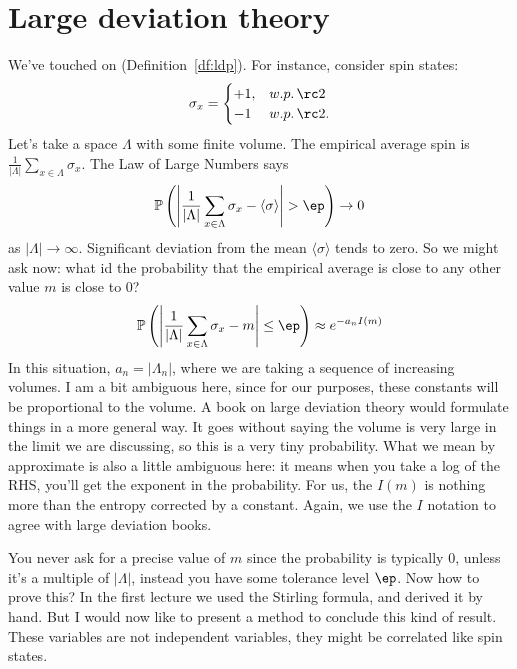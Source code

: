 \section{Large deviation theory}

We've touched on  (Definition~\ref{df:ldp}). For instance, consider spin states: 
\[
\sigma_x = 
\begin{cases}
+1, & w.p.\, \rc2 \\
-1 & w.p.\,\rc2.
\end{cases}
\]
Let's take a space $\Lambda$ with some finite volume. The empirical average spin is $\frac{1}{|\Lambda|} \sum_{x \in \Lambda} \sigma_x$. The Law of Large Numbers says 
\[
\mathbb{P}\left(\left|\frac{1}{|\Lambda|} \sum_{x \in \Lambda} \sigma_x - \langle \sigma \rangle \right| > \ep \right) \to 0
\]
as $|\Lambda| \to \infty$. Significant deviation from the mean $\langle \sigma \rangle$ tends to zero. So we might ask now: what id the probability that the empirical average is close to any other value $m$ is close to $0$? 
\[
\mathbb{P}\left(\left|\frac{1}{|\Lambda|} \sum_{x \in \Lambda} \sigma_x - m\right| \leq \ep \right) \approx e^{-a_n I(m)}
\]
In this situation, $a_n = |\Lambda_n|$, where we are taking a sequence of increasing volumes. I am a bit ambiguous here, since for our purposes, these constants will be proportional to the volume. A book on large deviation theory would formulate things in a more general way. It goes without saying the volume is very large in the limit we are discussing, so this is a very tiny probability. What we mean by approximate is also a little ambiguous here: it means when you take a log of the RHS, you'll get the exponent in the probability. For us, the $I(m)$ is nothing more than the entropy corrected by a constant. Again, we use the $I$ notation to agree with large deviation books. 

You never ask for a precise value of $m$ since the probability is typically $0$, unless it's a multiple of $|\Lambda|$, instead you have some tolerance level $\ep$. Now how to prove this? In the first lecture we used the Stirling formula, and derived it by hand. But I would now like to present a method to conclude this kind of result. These variables are not independent variables, they might be correlated like spin states. 

